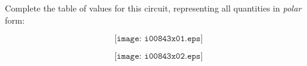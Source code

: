 

Complete the table of values for this circuit, representing all quantities in {\it polar} form:

$$\texttt{[image: i00843x01.eps]}$$







$$\texttt{[image: i00843x02.eps]}$$










